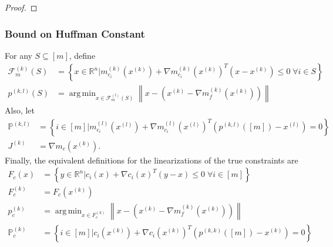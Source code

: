 \documentclass{article}
\theoremstyle{case}
\numberwithin{theorem}{subsection}
\DeclareMathOperator*{\argmin}{arg\,min}
\newcommand{\feasiblek}{{\mathcal F_m^{(k)}}}
\newcommand{\feasiblel}{{\mathcal F_m^{(l)}}}
\newcommand{\gk}{{\nabla m_f^{(k)}\left(\xk\right)}}
\newcommand{\gmcik}{{\nabla m_{c_i}^{(k)}\left(\xk\right)}}
\newcommand{\gmcil}{{\nabla m_{c_i}^{(l)}\left(\xl\right)}}
\newcommand{\mcik}{{{m}^{(k)}_{c_i}}}
\newcommand{\mcil}{{{m}^{(l)}_{c_i}}}
\newcommand{\Rn}{\mathbb R^n}
\newcommand{\xk}{x^{(k)}}
\newcommand{\xl}{{x^{(l)}}}
\newcommand{\projkl}{{p^{(k,l)}}}
\newcommand{\projkk}{{p^{(k,k)}}}
\newcommand{\trueprojk}{{p_c^{(k)}}}
\newcommand{\truefeasiblek}{{F_c^{(k)}}}
\newcommand{\truefeasible}{{F_c}}
\newcommand{\trueactiveprojk}{{\mathbb P_c^{(k)}}}
\newcommand{\activeprojkl}{{\mathbb P^{(k, l)}}}
\newcommand{\jackk}{{J^{(k)}}}
\begin{document}
\begin{proof}
% 




% 
% 
% 
% 

\end{proof}


\subsubsection{Bound on Huffman Constant}

For any $S \subseteq [m]$, define
\begin{align}
\feasiblek(S) &=  \left\{ x \in \Rn \bigg| \mcik\left(\xk\right) + \gmcik^T \left(x - \xk\right) \le 0 \; \forall i \in S \right\} \label{sha_fks} \\
\projkl(S) &= \argmin_{x \in \feasiblel(S)} \left\|x - \left(\xk - \gk\right)\right\| \label{sha_projkl}
\end{align}
Also, let
\begin{align}
\activeprojkl &= \left\{ i \in [m] \bigg| \mcil\left(\xl\right) + \gmcil^T \left(\projkl([m]) - \xl\right) = 0 \right\} \label{sha_proj_indices} \\
\jackk &= \nabla m_c\left(\xk\right) \label{sha_jacobian}.
\end{align}
Finally, the equivalent definitions for the linearizations of the true constraints are
\begin{align}
\truefeasible \left(x\right) &=  \left\{ y \in \Rn \bigg| c_i\left(x\right) + \nabla c_i\left(x\right)^T \left(y - x\right) \le 0 \; \forall i \in [m] \right\} \label{sha_truef} \\
\truefeasiblek &=  \truefeasible\left(\xk\right) \label{sha_truefk} \\
\trueprojk &= \argmin_{x \in \truefeasiblek} \left\|x - \left(\xk - \gk\right)\right\| \label{sha_trueproj} \\
\trueactiveprojk &= \left\{ i \in [m] \bigg| c_i\left(\xk\right) + \nabla c_i\left(\xk\right)^T \left(\projkk([m]) - \xk\right) = 0 \right\} \label{sha_true_proj_indices}
\end{align}
\end{document}
